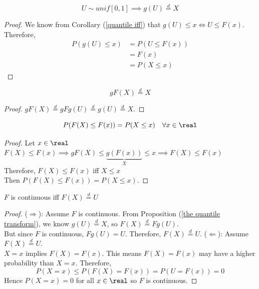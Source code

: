 \documentclass[11pt]{article}
\numberwithin{equation}{section}
\begin{document}
 \label{the quantile transform}
\begin{equation}
	U \sim unif[0, 1] \implies g(U) \overset{d}{=} X
\end{equation}
\begin{proof}
	We know from Corollary (\ref{quantile iff}) that $g(U) \leq x \iff U \leq F(x)$.\\
	Therefore,
	\begin{align}
		P(g(U) \leq x) &= P(U \leq F(x)) \\
		&= F(x) \tag{by the property of uniform distribution}\\
		&= P(X\leq x)
	\end{align}
\end{proof}

\corollary 
\begin{equation}
	gF(X) \overset{d}{=} X
\end{equation}
\begin{proof}
	$gF(X) \overset{d}{=} gFg(U) \overset{d}{=} g(U) \overset{d}{=} X$.
\end{proof}

\corollary
\begin{equation}
	P(F(X) \leq F(x)) = P(X \leq x) \quad \forall x \in \real
\end{equation}

\begin{proof}
	Let $x \in \real$\\
	$F(X) \leq F(x) \implies gF(X) \leq \underbrace{g(F(x))}_{X} \leq x \implies F(X) \leq F(x)$ \\
	Therefore, $F(X) \leq F(x)$ iff $X \leq x$\\
	Then $P(F(X) \leq F(x)) = P(X \leq x)$.
\end{proof}

$F$ is continuous iff $F(X) \overset{d}{=} U$
\begin{proof}
	($\Rightarrow$): Assume $F$ is continuous. From Proposition (\ref{the quantile transform}), we know $g(U) \overset{d}{=}X$, so $F(X) \overset{d}{=} Fg(U)$. \\
	 But since $F$ is continuous, $Fg(U) = U$. Therefore, $F(X) \overset{d}{=} U$.
	($\Leftarrow$): Assume $F(X) \overset{d}{=} U$. \\
	$X = x$ implies $F(X) = F(x)$. This means $F(X) = F(x)$ may have a higher probability than $X=x$. Therefore,
	$$P(X=x) \leq P(F(X) = F(x)) = P(U = F(x)) = 0$$
	Hence $P(X = x) = 0$ for all $x \in \real$ so $F$ is continuous.
\end{proof}
\end{document}
